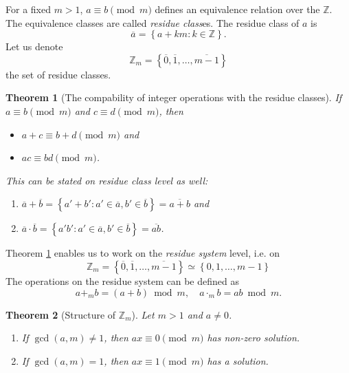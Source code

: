 \documentclass{article}
\newcommand{\Z}{\mathbb{Z}}
\newtheorem{theorem}{Theorem}
\begin{document}
For a fixed $m > 1$, $a \equiv b \pmod{m}$ defines an equivalence relation over the $\Z$.
The equivalence classes are called \emph{residue class}es.
The residue class of $a$ is
\[
    \overline{a} = \left\{ a + km : k \in \Z \right\}.
\]
Let us denote
\[
    \Z_m = \left\{ \overline{0}, \overline{1}, \ldots, \overline{m-1} \right\}
\]
the set of residue classes.

\begin{theorem}[The compability of integer operations with the residue classes]
    \label{th:compability}
    If $a \equiv b \pmod{m}$ and $c \equiv d \pmod{m}$, then
    \begin{itemize}
        \item $a + c \equiv b + d \pmod{m}$ and
        \item $ac \equiv bd \pmod{m}$.
    \end{itemize}

    This can be stated on residue class level as well:
    \begin{enumerate}
        \item $\overline{a} + \overline{b} = \left\{ a' + b' : a' \in \overline{a}, b' \in \overline{b} \right\} = \overline{a+b}$ and
        \item $\overline{a} \cdot \overline{b} = \left\{ a'b' : a' \in \overline{a}, b' \in \overline{b} \right\} = \overline{ab}$.
    \end{enumerate}
\end{theorem}

Theorem \ref{th:compability} enables us to work on the \emph{residue system} level, i.e. on
\[
    \Z_m = \left\{ \overline{0}, \overline{1}, \ldots, \overline{m-1} \right\} \simeq \left\{ 0, 1, \ldots, m-1 \right\}
\]
The operations on the residue system can be defined as
\[
    a +_m b = (a + b) \bmod m, \quad a \cdot_m b = ab \bmod m.
\]

\begin{theorem}[Structure of $\Z_m$]
    Let $m > 1$ and $a \neq 0$.
    \begin{enumerate}
        \item If $\gcd(a, m) \neq 1$, then $ax \equiv 0 \pmod{m}$ has non-zero solution.
        \item If $\gcd(a, m) = 1$, then $ax \equiv 1 \pmod{m}$ has a solution.
    \end{enumerate}
\end{theorem}
\end{document}
